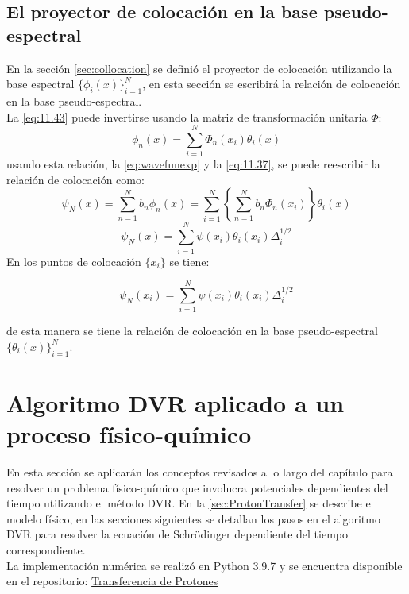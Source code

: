 \subsection{El proyector de colocación en la base pseudo-espectral}
En la sección \autoref{sec:collocation} se definió el proyector de colocación utilizando la base espectral $\{ \phi_i(x)\}_{i=1}^{N}$, en esta sección se escribirá la relación de colocación en la base pseudo-espectral.
\\

La \autoref{eq:11.43} puede invertirse usando la matriz de transformación unitaria $\Phi$:
\begin{equation}
  \label{eq:11.51}
  \phi_n(x) = \sum_{i=1}^{N}\Phi_n(x_i)\theta_i(x)
\end{equation}
usando esta relación, la \autoref{eq:wavefunexp} y la \autoref{eq:11.37}, se puede reescribir la relación de colocación como:
\begin{equation}
  \label{eq:11.53}
  \psi_N(x) = \sum_{n=1}^N b_n\phi_n(x) = \sum_{i=1}^N \left \{ \sum_{n=1}^Nb_n\Phi_n(x_i)\right\} \theta_i(x)
\end{equation}
\begin{equation}
  \label{eq:11.54}
  \psi_N(x) = \sum_{i=1}^N \psi(x_i)\theta_i(x_i)\Delta_i^{1/2}
\end{equation}
En los puntos de colocación $\{x_i\}$ se tiene:

\begin{equation}
  \label{eq:11.55}
  \psi_N(x_i) = \sum_{i=1}^N \psi(x_i)\theta_i(x_i)\Delta_i^{1/2}
\end{equation}

de esta manera se tiene la relación de colocación en la base pseudo-espectral $\{ \theta_i(x)\}_{i=1}^N$.

\section{Algoritmo DVR aplicado a un proceso físico-químico}\label{sec:DVRapp}

En esta sección se aplicarán los conceptos revisados a lo largo del capítulo para resolver un problema físico-químico que involucra potenciales dependientes del tiempo utilizando el método \acs{DVR}. En la \autoref{sec:ProtonTransfer} se describe el modelo físico, en las secciones siguientes se detallan los pasos en el algoritmo \acs{DVR} para resolver la ecuación de Schrödinger dependiente del tiempo correspondiente.
\\
La implementación numérica se realizó en Python 3.9.7 y se encuentra disponible en el repositorio: \href{https://github.com/Jessi-MM/PropagatorLearning/blob/main/src/ANN_as_Propagators_DidacticNotebook.ipynb}{\faGithub Transferencia de Protones}

